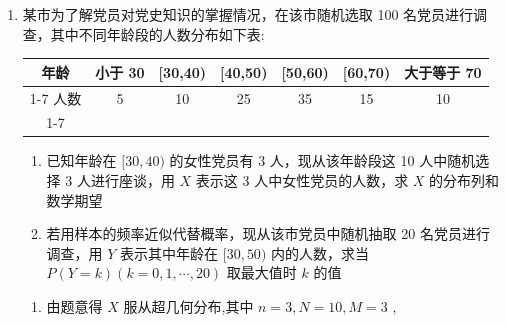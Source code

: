 \begin{enumerate}
\begin{enumerate}
\begin{jieda}
        $D\left( \xi \right)  = {\left( 1 - 2\right) }^{2} \times  \dfrac{1}{5} + {\left( 2 - 2\right) }^{2} \times  \dfrac{3}{5} + {\left( 3 - 2\right) }^{2} \times  \dfrac{1}{5} = \dfrac{2}{5}$
        
        $D\left( \eta \right)  = 3 \times  \dfrac{2}{3} \times  \left( {1 - \dfrac{2}{3}}\right)  = \dfrac{2}{3}$
        
        $P\left( {\xi  \geq  2}\right)  = \dfrac{3}{5} + \dfrac{1}{5} = \dfrac{4}{5},P\left( {\eta  \geq  2}\right)  = \dfrac{4}{9} + \dfrac{8}{27} = \dfrac{20}{27}$
        
        所以 $D\left( \xi \right)  < D\left( \eta \right) ,P\left( {\xi  \geq  2}\right)  > P\left( {\eta  \geq  2}\right)$ ,
        
        故从正确完成实验操作的题数的均值方面分析, 两人水平相当;
        
        从正确完成实验操作的题数的方差方面分析, 甲的水平更稳定;
        
        从至少正确完成 2 题的概率方面分析, 甲通过的可能性更大.
    \end{jieda}
    \item 某市为了解党员对党史知识的掌握情况，在该市随机选取 100 名党员进行调查，其中不同年龄段的人数分布如下表:
    
    \begin{center}
    \begin{tabular}{|c|c|c|c|c|c|c|}
    \hline
    年龄 & 小于 30 & [30,40) & [40,50) & [50,60) & [60,70) & 大于等于 70 \\
    \cline{1-7}
    人数 & 5 & 10 & 25 & 35 & 15 & 10 \\
    \cline{1-7}
    \hline
    \end{tabular}
    \end{center}
    \begin{enumerate}
        \item 已知年龄在 $\lbrack {30},{40})$ 的女性党员有 3 人，现从该年龄段这 10 人中随机选择 3 人进行座谈，用 $X$ 表示这 3 人中女性党员的人数，求 $X$ 的分布列和数学期望
        \item 若用样本的频率近似代替概率，现从该市党员中随机抽取 20 名党员进行调查，用 $Y$ 表示其中年龄在 $\lbrack {30},{50})$ 内的人数，求当 $P\left( {Y = k}\right) \left( {k = 0,1,\cdots ,{20}}\right)$ 取最大值时 $k$ 的值
    \end{enumerate}
    \begin{jieda}
        \begin{enumerate}
            \item 由题意得 $X$ 服从超几何分布,其中 $n = 3,N = {10},M = 3$ ,
            

\end{enumerate}
\end{jieda}
\end{enumerate}
\end{enumerate}
